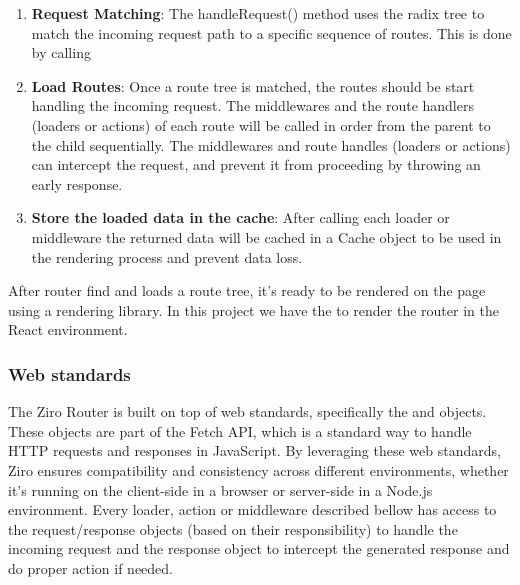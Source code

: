 \begin{enumerate}
  \item \textbf{Request Matching}: The handleRequest() method uses the radix tree to match the incoming request path to a specific sequence of routes. This is done by calling 

  \item \textbf{Load Routes}: Once a route tree is matched, the routes should be start handling the incoming request. The middlewares and the route handlers (loaders or actions) of each route will be called in order from the parent to the child sequentially. The middlewares and route handles (loaders or actions) can intercept the request, and prevent it from proceeding by throwing an early response.

  \item \textbf{Store the loaded data in the cache}: After calling each loader or middleware the returned data will be cached in a Cache object to be used in the rendering process and prevent data loss.

\end{enumerate}

After router find and loads a route tree, it's ready to be rendered on the page using a rendering library. In this project we have the  to render the router in the React environment.


\subsubsection{Web standards}

The Ziro Router is built on top of web standards, specifically the  and  objects. These objects are part of the Fetch API, which is a standard way to handle HTTP requests and responses in JavaScript. By leveraging these web standards, Ziro ensures compatibility and consistency across different environments, whether it's running on the client-side in a browser or server-side in a Node.js environment. Every loader, action or middleware described bellow has access to the request/response objects (based on their responsibility) to handle the incoming request and the response object to intercept the generated response and do proper action if needed.

